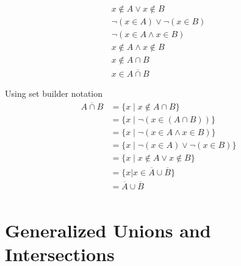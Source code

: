 \documentclass[12pt letter]{report}
\begin{document}
{\begin{myproof}
\begin{align*}
      x \notin A \vee x \notin B \tag*{Definition of union}                                                \\
      \neg \left( x \in A \right)  \vee  \neg \left( x \in B \right)  \tag*{Definition of Complement}      \\
      \neg \left( x \in A \wedge  x \in B \right) \tag*{By Second De Morgan's Law for propositional logic} \\
      x \notin A \wedge x \notin B \tag*{Definition of Complement}                                         \\
      x \notin A \cap B \tag*{Definition of intersection}                                                  \\
      x \in \overline{A \cap B} \tag*{Definition of Complement}
    \end{align*}

  \end{myproof}
  \noindent Using set builder notation
  \begin{align*}
    \overline{A \cap B} & = \{ x  \mid x \notin A \cap B\} \tag*{Definition of Complement}                                                \\
                        & = \{x  \mid \neg \left( x \in \left( A \cap B \right)  \right) \} \tag*{Definition of $\notin$}                 \\
                        & = \{x  \mid \neg \left( x \in A \wedge x \in B \right) \} \tag*{Definition of Intersection}                     \\
                        & = \{x  \mid \neg \left( x \in A \right) \vee \neg \left( x \in B \right)  \} \tag*{By First De Morgan's Law for
    propositional logic}                                                                                                                  \\
                        & = \{x  \mid x \notin A \vee x \notin B\} \tag*{Definition of Complement}                                        \\
                        & = \{x | x \in \overline{A} \cup \overline{B}\} \tag*{Definition of union}                                       \\
                        & = \overline{A} \cup \overline{B}                                                                                \\
  \end{align*}
}

\section{Generalized Unions and Intersections}
\end{document}

